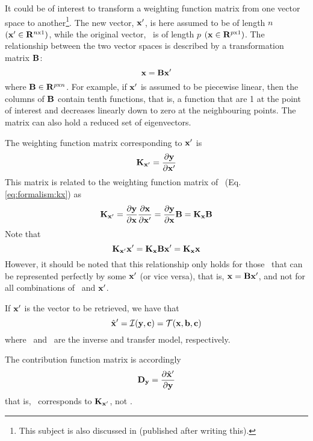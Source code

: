  
 It could be of interest to transform a weighting function matrix from
 one vector space to another\footnote{This subject is also discussed
   in \citet{rodgers:00} (published after writing this).}. The new
 vector, $\mathbf{x}'$, is here assumed to be of length $n$ $(\mathbf{x}' \in
 {\bf R}^{n {\mathrm x} 1})$, while the original vector, \xt\ is of length $p$
 $(\mathbf{x} \in {\bf R}^{p {\mathrm x} 1})$.  The relationship between the two vector
 spaces is described by a transformation matrix $\mathbf{B}$:
  \begin{equation}
    \mathbf{x} = \mathbf{B}\mathbf{x}'
  \end{equation}
  where $\mathbf{B} \in {\bf R}^{p {\mathrm x} n}$. For example, if $\mathbf{x}'$ is assumed to be
  piecewise linear, then the columns of $\mathbf{B}$ contain tenth functions,
  that is, a function that are 1 at the point of interest and decreases
  linearly down to zero at the neighbouring points.  The matrix can
  also hold a reduced set of eigenvectors.
    
  The weighting function matrix corresponding to $\mathbf{x}'$ is
  \begin{equation}
    \mathbf{K}_{\mathbf{x}'} = \frac{\partial \mathbf{y}}{\partial \mathbf{x}'}
  \end{equation}
  This matrix is related to the weighting function matrix of \xt\ (Eq.
  \ref{eq:formalism:kx}) as
  \begin{equation}
    \mathbf{K}_{\mathbf{x}'}
      = \frac{\partial \mathbf{y}}{\partial \mathbf{x}} \frac{\partial \mathbf{x}}{\partial \mathbf{x}'}
      = \frac{\partial \mathbf{y}}{\partial \mathbf{x}} \mathbf{B} 
      = \mathbf{K_x} \mathbf{B}
  \end{equation}
  Note that
  \begin{equation}
    \mathbf{K}_{\mathbf{x}'}\mathbf{x}' = \mathbf{K_x}\mathbf{B}\mathbf{x}' =  \mathbf{K_x}\mathbf{x}
  \end{equation}
  However, it should be noted that this relationship only holds for
  those \xt\ that can be represented perfectly by some $\mathbf{x}'$ (or vice
  versa), that is, $\mathbf{x}=\mathbf{B}\mathbf{x}'$, and not for all combinations of \xt\ 
  and $\mathbf{x}'$.

  If $\mathbf{x}'$ is the vector to be retrieved, we have that \citep{rodgers:90}
  \begin{equation}
    \hat{\mathbf{x}}' = \mathcal{I}(\mathbf{y},\mathbf{c}) = \mathcal{T}(\mathbf{x},\mathbf{b},\mathbf{c})
  \end{equation}
  where \im\ and \tm\ are the inverse and transfer model, respectively.

  The contribution function matrix is accordingly
  \begin{equation}
    \mathbf{D_y} =  \frac{\partial \hat{\mathbf{x}}'}{\partial \mathbf{y}}
  \end{equation}
  that is, \Dy\ corresponds to $\mathbf{K}_{\mathbf{x}'}$, not \Kx.
  
